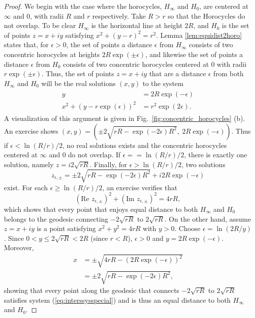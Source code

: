 \documentclass[10pt,a4paper]{article}
\begin{document}
 \begin{proof}
     We begin with the case where the horocycles, $H_{\infty}$ and $H_{0}$, are centered at $\infty$ and $0$, with radii $R$ and $r$ respectively.  Take $R > r$ so that the Horocycles do not overlap. To be clear $H_{\infty}$ is the horizontal line at height $2R$, and $H_0$ is the set of points $z = x+ iy$ satisfying $x^2 +  (y-r)^2 = r^2$.  Lemma \ref{lem:equidist2horo} states that, for $\epsilon > 0$, the set of points a distance $\epsilon$ from $H_{\infty}$ consists of two concentric horocycles at heights $2R\exp(\pm \epsilon)$, and likewise the set of points a distance $\epsilon$ from $H_0$ consists of two concentric horocycles centered at 0 with radii $r\exp(\pm \epsilon)$.  Thus, the set of points $z = x + iy$ that are a distance $\epsilon$ from both $H_{\infty}$ and $H_0$ will be the real solutions $(x,y)$ to the system 
 \begin{align}
     \begin{aligned}
         y & = 2 R \exp(-\epsilon) \\
         x^2 + (y - r\exp(\epsilon))^2 & = r^2\exp(2\epsilon).
     \end{aligned}
     \label{eq:interssysspecial}
 \end{align}
 A visualization of this argument is given in Fig.\ \ref{fig:concentric_horocycles} (b).  An exercise shows $(x,y) = \left(\pm 2\sqrt{rR-\exp(-2\epsilon)R^2}, \; 2 R \exp(-\epsilon)\right)$.  Thus if $\epsilon < \ln(R/r)/2$, no real solutions exists and the concentric horocycles centered at $\infty$ and 0 do not overlap. If $\epsilon == \ln(R/r)/2$, there is exactly one solution, namely $z = i 2\sqrt{rR}$. Finally, for $\epsilon > \ln(R/r)/2$, two solutions 
 \[
 z_{\epsilon, \pm} = \pm 2\sqrt{rR-\exp(-2\epsilon)R^2} + i 2 R \exp(-\epsilon)
 \]
 exist. For each $\epsilon \geq \ln(R/r)/2$, an exercise verifies that 
 \[
 \left(\text{Re } z_{\epsilon, \pm}\right)^2 + \left(\text{Im } z_{\epsilon, \pm}\right)^2 = 4 rR,
 \]
 which shows that every point that enjoys equal distance to both $H_{\infty}$ and $H_0$ belongs to the geodesic connecting $-2\sqrt{rR}$ to $2\sqrt{rR}$. On the other hand, assume $z = x+iy$ is a point satisfying $x^2 + y^2 = 4rR$ with $y > 0$. Choose $\epsilon = \ln(2R/y)$. Since $0 < y \leq 2\sqrt{rR} < 2R$ (since $r < R$), $\epsilon > 0$ and $y = 2R\exp(-\epsilon)$. Moreover, 
 \begin{align*}
     x & = \pm \sqrt{4rR - (2R\exp(-\epsilon))^2} \\
       & = \pm 2\sqrt{rR-\exp(-2\epsilon)R^2},
 \end{align*} 
 showing that every point along the geodesic that connects $-2\sqrt{rR}$ to $2\sqrt{rR}$ satisfies system (\ref{eq:interssysspecial}) and is thus an equal distance to both $H_{\infty}$ and $H_0$. 


\end{proof}
\end{document}

